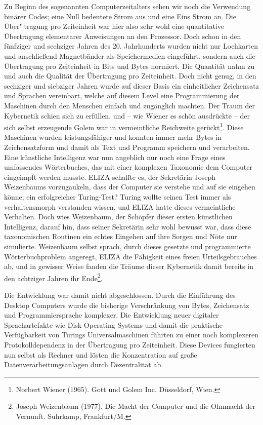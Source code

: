 \documentclass[12pt,a4paper]{article}
\begin{document}
Zu Beginn des sogenannten Computerzeitalters sehen wir noch die Verwendung
binärer Codes; eine Null bedeutete Strom aus und eine Eins Strom an. Die
Über"|tragung pro Zeiteinheit war hier also sehr wohl eine quantitative
Übertragung elementarer Anweisungen an den Prozessor. Doch schon in den
fünfziger und sechziger Jahren des 20. Jahrhunderts wurden nicht nur
Lochkarten und anschließend Magnetbänder als Speichermedien eingeführt,
sondern auch die Übertragung pro Zeiteinheit in Bits und Bytes normiert. Die
Quantität nahm zu und auch die Qualität der Übertragung pro Zeiteinheit. Doch
nicht genug, in den sechziger und siebziger Jahren wurde auf dieser Basis ein
einheitlicher Zeichensatz und Sprachen vereinbart, welche auf diesem Level
eine Programmierung der Maschinen durch den Menschen einfach und zugänglich
machten. Der Traum der Kybernetik schien sich zu erfüllen, und -- wie Wiener
es schön ausdrückte -- der sich selbst erzeugende Golem war in vermeintliche
Reichweite gerückt\footnote{Norbert Wiener (1965). Gott und Golem Inc.
  Düsseldorf, Wien.}. Diese Maschinen wurden leistungsfähiger und konnten
immer mehr Bytes in Zeichensatzform und damit als Text und Programm speichern
und verarbeiten. Eine künstliche Intelligenz war nun angeblich nur noch eine
Frage eines umfassendes Wörterbuches, das mit einer komplexen Taxonomie dem
Computer eingeimpft werden musste. ELIZA schaffte es, der Sekretärin Joseph
Weizenbaums vorzugaukeln, dass der Computer sie verstehe und auf sie eingehen
könne; ein erfolgreicher Turing-Test? Turing wollte seinen Test immer als
verhaltensmorph verstanden wissen, und ELIZA hatte dieses vermeintliche
Verhalten. Doch wies Weizenbaum, der Schöpfer dieser ersten künstlichen
Intelligenz, darauf hin, dass seiner Sekretärin sehr wohl bewusst war, dass
diese taxonomischen Routinen ein echtes Eingehen auf ihre Sorgen und Nöte nur
simulierte.
\newpage
Weizenbaum selbst sprach, durch dieses gesetzte und programmierte
Wörterbuchproblem angeregt, ELIZA die Fähigkeit eines freien Urteilsgebrauches
ab, und in gewisser Weise fanden die Träume dieser Kybernetik damit bereits in
den achtziger Jahren ihr Ende\footnote{Joseph Weizenbaum (1977). Die Macht der
  Computer und die Ohnmacht der Vernunft. Suhrkamp, Frankfurt/M. }.

Die Entwicklung war damit nicht abgeschlossen. Durch die Einführung des
Desktop Computers wurde die bisherige Verschränkung von Bytes, Zeichensatz und
Programmiersprache komplexer. Die Entwicklung neuer digitaler Sprachartefakte
wie Disk Operating Systems und damit die praktische Verfügbarkeit von Turings
Universalmaschinen führten zu einer noch komplexeren Protokolldependenz in der
Übertragung pro Zeiteinheit. Diese Devices fungierten nun selbst als Rechner
und lösten die Konzentration auf große Datenverarbeitungsanlagen durch
Dezentralität ab.
\end{document}
